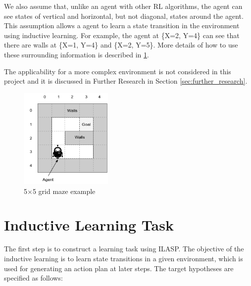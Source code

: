 We also assume that, unlike an agent with other RL algorithms, the agent can see states of vertical and horizontal, but not diagonal, states around the agent. 
This assumption allows a agent to learn a state transition in the environment using inductive learning. For example, the agent at \{X=2, Y=4\} can see that there are walls at \{X=1, Y=4\} and \{X=2, Y=5\}.
More details of how to use these surrounding information is described in \ref{sec:inductive_learning_task}.

The applicability for a more complex environment is not considered in this project and it is discussed in Further Research in Section \ref{sec:further_research}.

\begin{figure}[!htb]
\centering
\includegraphics[width=0.4\textwidth]{./figures/environment_example}
\caption{5$\times$5 grid maze example}
\label{environment_example}
\end{figure}

\section{Inductive Learning Task}
\label{sec:inductive_learning_task}
The first step is to construct a learning task using ILASP. The objective of the inductive learning is to learn state transitions in a given environment, which is used for generating an action plan at later steps.
The target hypotheses are specified as follows:

